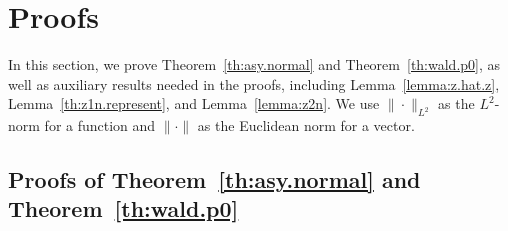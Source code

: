 \documentclass[times,sort&compress,3p]{elsarticle}
\theoremstyle{plain}%
\theoremstyle{definition}
\begin{document}
\section{Proofs} \label{section:proof} 


In this section, we prove Theorem~\ref{th:asy.normal} and Theorem~\ref{th:wald.p0}, as well as auxiliary results needed in the proofs, including Lemma~\ref{lemma:z.hat.z}, Lemma~\ref{th:z1n.represent}, and Lemma~\ref{lemma:z2n}. We use $\|\cdot\|_{L^2}$ as the $L^2$-norm for a function and $\|\cdot\|$ as the Euclidean norm for a vector. 

\subsection{Proofs of Theorem~\ref{th:asy.normal} and Theorem~\ref{th:wald.p0}}
\end{document}
